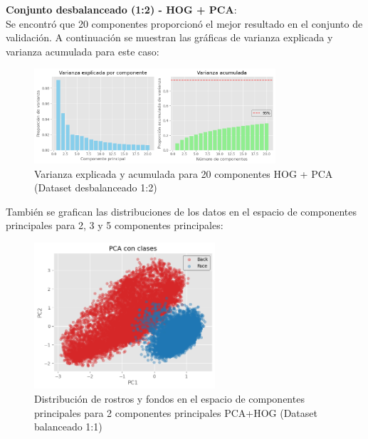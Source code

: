 \documentclass{article}
\begin{document}
\textbf{Conjunto desbalanceado (1:2) - HOG + PCA}:\\

Se encontró que 20 componentes proporcionó el mejor resultado en el conjunto de validación. A continuación se muestran las gráficas de varianza explicada y varianza acumulada para este caso:
\begin{figure}[H]
    \centering
    \includegraphics[width=0.8\textwidth]{tarea_4/imagenes/variance_x1_v1_20.png}
    \caption{Varianza explicada y acumulada para 20 componentes HOG + PCA (Dataset desbalanceado 1:2)}
    \label{fig:hog_pca_variance_x1}
\end{figure}

También se grafican las distribuciones de los datos en el espacio de componentes principales para 2, 3 y 5 componentes principales:

\begin{figure}[H]
    \centering
    \includegraphics[width=0.6\textwidth]{tarea_4/imagenes/pca_classes_x1_v1_20_2_components.png}
    \caption{Distribución de rostros y fondos en el espacio de componentes principales para 2 componentes principales PCA+HOG (Dataset balanceado 1:1)}
    \label{fig:pca_classes}
\end{figure}
\end{document}
